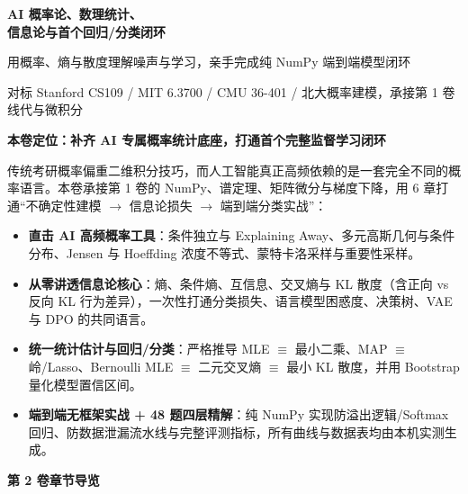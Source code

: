 \documentclass[UTF8,10.5pt,a4paper,oneside,fontset=fandol,scheme=plain]{ctexbook}
\begin{document}
{\fontsize{24}{32}\selectfont\sffamily\bfseries\color{ink}AI 概率论、数理统计、\\信息论与首个回归/分类闭环}\par
\vspace{2.5mm}
{\large\sffamily\color{teal}用概率、熵与散度理解噪声与学习，亲手完成纯 NumPy 端到端模型闭环}\par
\vspace{4.5mm}
{\small\color{slate}对标 Stanford CS109 / MIT 6.3700 / CMU 36-401 / 北大概率建模，承接第 1 卷线代与微积分}\par

\vspace{5.5mm}

\begin{tcolorbox}[
  enhanced,
  colback=tealLight,
  colframe=tealLine,
  arc=2mm,
  boxrule=0.6pt,
  left=4.5mm,right=4.5mm,top=3mm,bottom=3mm
]
\textbf{\sffamily\color{tealDark}本卷定位：补齐 AI 专属概率统计底座，打通首个完整监督学习闭环}\par\vspace{1.2mm}
\small
传统考研概率偏重二维积分技巧，而人工智能真正高频依赖的是一套完全不同的概率语言。本卷承接第 1 卷的 NumPy、谱定理、矩阵微分与梯度下降，用 6 章打通“不确定性建模 $\to$ 信息论损失 $\to$ 端到端分类实战”：
\begin{itemize}
  \item \textbf{直击 AI 高频概率工具}：条件独立与 Explaining Away、多元高斯几何与条件分布、Jensen 与 Hoeffding 浓度不等式、蒙特卡洛采样与重要性采样。
  \item \textbf{从零讲透信息论核心}：熵、条件熵、互信息、交叉熵与 KL 散度（含正向 vs 反向 KL 行为差异），一次性打通分类损失、语言模型困惑度、决策树、VAE 与 DPO 的共同语言。
  \item \textbf{统一统计估计与回归/分类}：严格推导 MLE $\equiv$ 最小二乘、MAP $\equiv$ 岭/Lasso、Bernoulli MLE $\equiv$ 二元交叉熵 $\equiv$ 最小 KL 散度，并用 Bootstrap 量化模型置信区间。
  \item \textbf{端到端无框架实战 + 48 题四层精解}：纯 NumPy 实现防溢出逻辑/Softmax 回归、防数据泄漏流水线与完整评测指标，所有曲线与数据表均由本机实测生成。
\end{itemize}
\end{tcolorbox}

\vspace{4.5mm}

\noindent\textbf{\sffamily\color{tealDark}第 2 卷章节导览}
\vspace{1.5mm}
\end{document}
